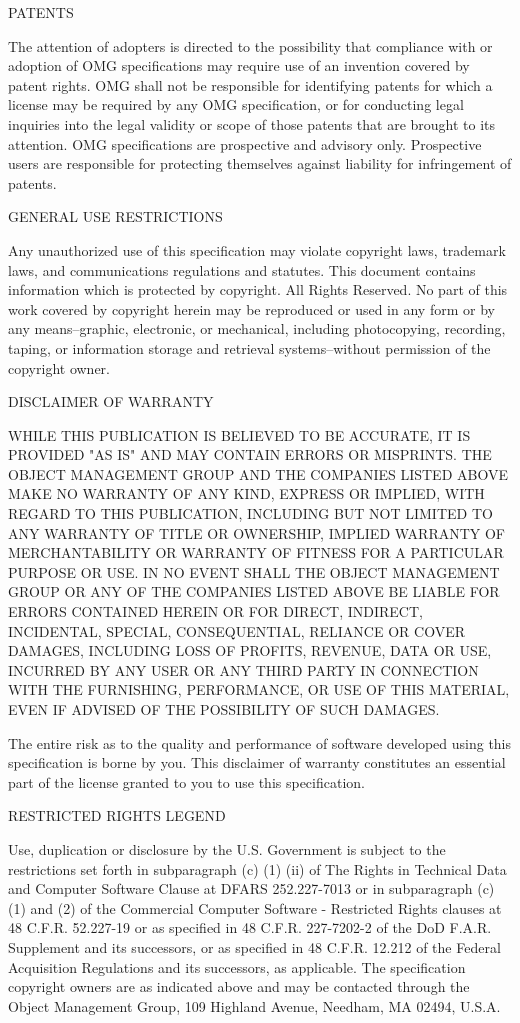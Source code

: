 \documentclass[10pt, a4paper]{isov2}
\newcommand{\OMGparagraph}[1]{
\vspace{23pt}
{\centerline {#1}}
\vspace{3pt}
}
\begin{document}
\OMGparagraph{PATENTS}
The attention of adopters is directed to the possibility that compliance with or adoption of OMG 
 specifications may require use of an invention covered by patent rights. OMG shall not be 
  responsible for identifying patents for which a license may be required by any OMG specification, 
   or for conducting legal inquiries into the legal validity or scope of those patents that are 
    brought to its attention. OMG specifications are prospective and advisory only. Prospective 
	 users are responsible for protecting themselves against liability for infringement of patents.

\OMGparagraph{GENERAL USE RESTRICTIONS}
Any unauthorized use of this specification may violate copyright laws, trademark laws, and 
 communications regulations and statutes. This document contains information which is protected by 
  copyright. All Rights Reserved. No part of this work covered by copyright herein may be 
   reproduced or used in any form or by any means--graphic, electronic, or mechanical, including 
    photocopying, recording, taping, or information storage and retrieval systems--without 
	 permission of the copyright owner.

\newpage
\OMGparagraph{DISCLAIMER OF WARRANTY}
WHILE THIS PUBLICATION IS BELIEVED TO BE ACCURATE, IT IS PROVIDED "AS IS" AND MAY CONTAIN ERRORS OR MISPRINTS. THE OBJECT MANAGEMENT GROUP AND THE COMPANIES LISTED ABOVE MAKE NO WARRANTY OF ANY KIND, EXPRESS OR IMPLIED, WITH REGARD TO THIS PUBLICATION, INCLUDING BUT NOT LIMITED TO ANY WARRANTY OF TITLE OR OWNERSHIP, IMPLIED WARRANTY OF MERCHANTABILITY OR WARRANTY OF FITNESS FOR A PARTICULAR PURPOSE OR USE. IN NO EVENT SHALL THE OBJECT MANAGEMENT GROUP OR ANY OF THE COMPANIES LISTED ABOVE BE LIABLE FOR ERRORS CONTAINED HEREIN OR FOR DIRECT, INDIRECT, INCIDENTAL, SPECIAL, CONSEQUENTIAL, RELIANCE OR COVER DAMAGES, INCLUDING LOSS OF PROFITS, REVENUE, DATA OR USE, INCURRED BY ANY USER OR ANY THIRD PARTY IN CONNECTION WITH THE FURNISHING, PERFORMANCE, OR USE OF THIS MATERIAL, EVEN IF ADVISED OF THE POSSIBILITY OF SUCH DAMAGES.


The entire risk as to the quality and performance of software developed using this specification is borne by you. This disclaimer of warranty constitutes an essential part of the license granted to you to use this specification.


\OMGparagraph{RESTRICTED RIGHTS LEGEND}
Use, duplication or disclosure by the U.S. Government is subject to the restrictions set forth in 
 subparagraph (c) (1) (ii) of The Rights in Technical Data and Computer Software Clause at DFARS 
  252.227-7013 or in subparagraph (c)(1) and (2) of the Commercial Computer Software - Restricted 
   Rights clauses at 48 C.F.R. 52.227-19 or as specified in 48 C.F.R. 227-7202-2 of the DoD F.A.R. 
    Supplement and its successors, or as specified in 48 C.F.R. 12.212 of the Federal Acquisition 
 Regulations and its successors, as applicable. The specification copyright owners are as 
 indicated above and may be contacted through the Object Management Group, 109 Highland 
 Avenue, Needham, MA 02494, U.S.A.
  
\end{document}
